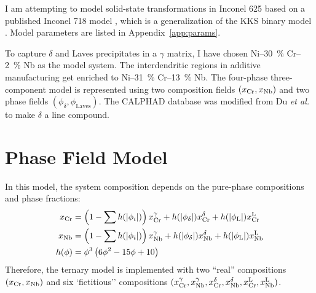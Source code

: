\documentclass[10pt]{article}
\begin{document}
	I am attempting to model solid-state transformations in Inconel 625 based on a published Inconel 718 model \cite{Zhou2014},
	which is a generalization of the KKS binary model \cite{Kim1999}.
	Model parameters are listed in Appendix~\ref{app:params}.
	
	To capture $\delta$ and Laves precipitates in a $\gamma$ matrix, I have chosen Ni--\SI{30}{\percent} Cr--\SI{2}{\percent} Nb as the model system.
	The interdendritic regions in additive manufacturing get enriched to Ni--\SI{31}{\percent} Cr--\SI{13}{\percent} Nb.
	The four-phase three-component model is represented using two composition fields $\left(x_{\ce{Cr}}, x_{\ce{Nb}}\right)$
	and two phase fields $\left(\phi_{\delta}, \phi_{\mathrm{Laves}}\right)$.
	The CALPHAD database was modified from Du \emph{et al.} \cite{Du2005} to make $\delta$ a line compound.


	\section{Phase Field Model}
		In this model, the system composition depends on the pure-phase compositions and phase fractions:
		\begin{align}
			x_{\ce{Cr}} &= \left( 1-\sum h(|\phi_i|) \right) x_{\ce{Cr}}^{\gamma}
			             + h(|\phi_{\delta}|) x_{\ce{Cr}}^{\delta}
			             + h(|\phi_{\mathrm{L}}|) x_{\ce{Cr}}^{\mathrm{L}}
						\label{eqn:conscr}\\
			x_{\ce{Nb}} &= \left( 1-\sum h(|\phi_i|) \right) x_{\ce{Nb}}^{\gamma}
			             + h(|\phi_{\delta}|) x_{\ce{Nb}}^{\delta}
			             + h(|\phi_{\mathrm{L}}|) x_{\ce{Nb}}^{\mathrm{L}}
 			             \label{eqn:consnb}\\
 			h(\phi)     &= \phi^3\left(6\phi^2 - 15\phi + 10\right)\label{eqn:interp}
		\end{align}
		Therefore, the ternary model is implemented with two ``real'' compositions $(x_{\ce{Cr}}, x_{\ce{Nb}})$ and
		six `fictitious'' compositions $(x_{\ce{Cr}}^{\gamma}, x_{\ce{Nb}}^{\gamma}, x_{\ce{Cr}}^{\delta}, x_{\ce{Nb}}^{\delta}, x_{\ce{Cr}}^{\mathrm{L}}, x_{\ce{Nb}}^{\mathrm{L}})$.
\end{document}
